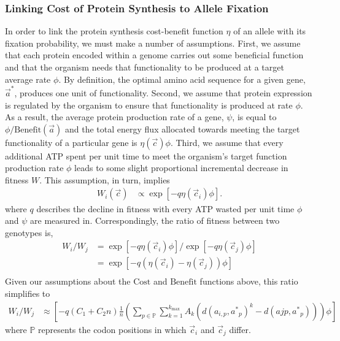 \documentclass{article}
\newcommand{\setP}{\ensuremath{\mathbb{P}}\xspace}
\newcommand{\kmax}{\ensuremath{{k_{\max}}}\xspace}
\newcommand{\cvec}{\ensuremath{\Vec{c}}\xspace}
\newcommand{\cveci}{\ensuremath{\cvec_i}\xspace}
\newcommand{\cvecj}{\ensuremath{\cvec_j}\xspace}
\newcommand{\aip}{\ensuremath{a_{i,p}}\xspace}
\newcommand{\avec}{\ensuremath{\Vec{a}}\xspace}
\newcommand{\aopt}{\ensuremath{a^*}\xspace}
\newcommand{\aoptp}{\ensuremath{\aopt_p}\xspace}
\newcommand{\aoptvec}{\ensuremath{\Vec{a}^*}\xspace}
\newcommand{\Cost}{\ensuremath{\text{Cost}}\xspace}
\newcommand{\Func}{\ensuremath{\text{Benefit}}\xspace}
\begin{document}
\subsubsection*{Linking Cost of Protein Synthesis to Allele Fixation}
In order to link the protein synthesis cost-benefit function $\eta$ of an allele with its fixation probability, we must make a number of assumptions.
First, we assume that each protein encoded within a genome carries out some beneficial function and that the organism needs that functionality to be produced at a target average rate $\phi$.
By definition, the optimal amino acid sequence for a given gene, \aoptvec, produces one unit of functionality.
Second, we assume that protein expression is regulated by the organism to ensure that functionality is produced at rate $\phi$.
As a result, the average protein production rate of a gene, $\psi$, is equal to $\phi/\Func(\avec)$ and the total energy flux allocated towards meeting the target functionality of a particular gene is $\eta(\cvec) \phi$. 
Third, we assume that every additional ATP spent per unit time to meet the organism's target function production rate $\phi$ leads to some slight proportional incremental decrease in fitness $W$.
This assumption, in turn, implies 
\begin{align}
  W_i\left(\cvec\right) &\propto \exp\left[- q \eta(\cveci) \phi\right].
\end{align}
where $q$ describes the decline in fitness with every ATP wasted per unit time $\phi$ and $\psi$ are measured in.
Correspondingly, the ratio of fitness between two genotypes is,
\begin{align*}
  W_i/W_j &=  \exp\left[- q \eta(\cveci) \phi\right]/\exp\left[- q \eta(\cvecj) \phi\right]\\
  &=  \exp\left[- q \left(\eta(\cveci)- \eta(\cvecj)\right) \phi\right]\\
\end{align*}
Given our assumptions about the \Cost and \Func functions above, this ratio simplifies to
\begin{align}
  W_i/W_j &\approx \left[- q \left(C_1 + C_2 n\right) \frac{1}{n}\left(\sum_{p \in \setP} \sum_{k=1}^\kmax A_k \left(d\left(\aip,\aoptp\right)^k - d\left(ajp,\aoptp\right)\right)\right) \phi \right]
\end{align}
where \setP represents the codon positions in which \cveci and \cvecj differ.
\end{document}
